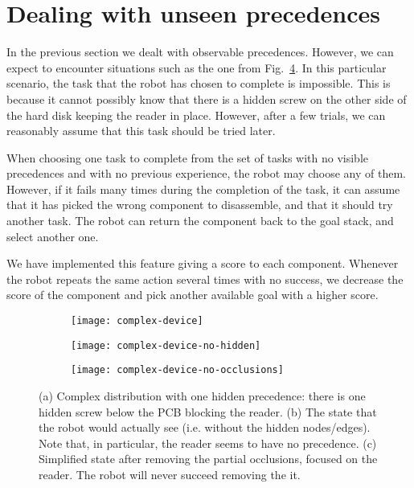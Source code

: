 \documentclass[../root.tex]{subfiles}
\begin{document}
\section{Dealing with unseen precedences}

In the previous section we dealt with observable precedences. However, we can
expect to encounter situations such as the one from Fig.~\ref{fig:complex-device}.
In this particular scenario, the task that the robot has chosen to complete is impossible.
This is because it cannot possibly know that there is a hidden screw on the other side
of the hard disk keeping the reader in place. However, after a few trials, we can reasonably
assume that this task should be tried later.

When choosing one task to complete from the set of tasks with no visible precedences and
with no previous experience, the robot may choose any of them. However, if it fails many
times during the completion of the task, it can assume that it has picked the wrong
component to disassemble, and that it should try another task. The robot can return the
component back to the goal stack, and select another one.

We have implemented this feature giving a score to each component. Whenever the robot repeats
the same action several times with no success, we decrease the score of the component and
pick another available goal with a higher score.

\begin{figure}[tbhp]
	\centering
	\begin{subfigure}[b]{0.77\columnwidth}
		\texttt{[image: complex-device]}
		\caption{}
		\label{fig:complex-device-all}
	\end{subfigure}

	\vspace{0.5cm}

	\begin{subfigure}[b]{0.75\columnwidth}
		\texttt{[image: complex-device-no-hidden]}
		\caption{}
		\label{fig:complex-device-no-hidden}
	\end{subfigure}

	\vspace{0.5cm}

	\begin{subfigure}[b]{0.60\columnwidth}
		\texttt{[image: complex-device-no-occlusions]}
		\caption{}
		\label{fig:complex-device-no-occlusions}
	\end{subfigure}
	\caption{
		(a) Complex distribution with one hidden precedence: there is one hidden
			screw below the PCB blocking the reader.
		(b) The state that the robot would actually see (i.e. without the
			hidden nodes/edges). Note that, in particular, the reader seems
			to have no precedence.
        (c) Simplified state after removing the partial occlusions, focused on the
			reader. The robot will never succeed removing the it.
	}
	\label{fig:complex-device}
\end{figure}

\end{document}
